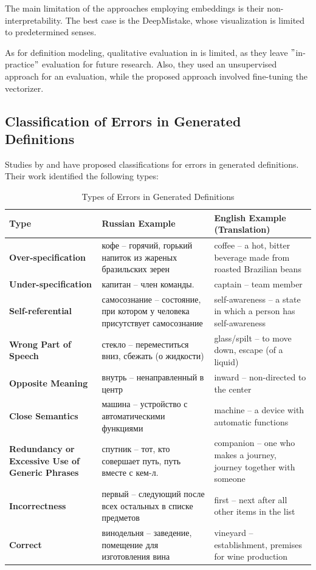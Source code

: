 \documentclass[11pt]{article}
\begin{document}
The main limitation of the approaches employing embeddings is their non-interpretability.
The best case is the DeepMistake, whose visualization is limited to predetermined senses.

As for definition modeling, qualitative evaluation in  is limited, as they leave \("\)in-practice\("\) evaluation for future research.
Also, they used an unsupervised approach for an evaluation, while the proposed approach involved fine-tuning the vectorizer.

\subsection{Classification of Errors in Generated Definitions}

Studies by  and  have proposed classifications for errors in generated definitions.
Their work identified the following types:

\begin{table}[H]
    \centering
    \caption{Types of Errors in Generated Definitions}
    \begin{tabular}{|p{3.5cm}|p{6.5cm}|p{5.5cm}|}
        \hline
        \textbf{Type} & \textbf{Russian Example} & \textbf{English Example (Translation)} \\ \hline
        \textbf{Over-specification} & кофе -- горячий, горький напиток из жареных бразильских зерен & coffee -- a hot, bitter beverage made from roasted Brazilian beans \\ \hline
        \textbf{Under-specification} & капитан -- член команды. & captain -- team member \\ \hline
        \textbf{Self-referential} & самосознание -- состояние, при котором у человека присутствует самосознание & self-awareness -- a state in which a person has self-awareness \\ \hline
        \textbf{Wrong Part of Speech} & стекло -- переместиться вниз, сбежать (о жидкости) & glass/spilt -- to move down, escape (of a liquid) \\ \hline
        \textbf{Opposite Meaning} & внутрь -- ненаправленный в центр & inward -- non-directed to the center \\ \hline
        \textbf{Close Semantics} & машина -- устройство с автоматическими функциями & machine -- a device with automatic functions \\ \hline
        \textbf{Redundancy or Excessive Use of Generic Phrases} & спутник -- тот, кто совершает путь, путь вместе с кем-л. & companion -- one who makes a journey, journey together with someone \\ \hline
        \textbf{Incorrectness} & первый -- следующий после всех остальных в списке предметов & first -- next after all other items in the list \\ \hline
        \textbf{Correct} & винодельня -- заведение, помещение для изготовления вина & vineyard -- establishment, premises for wine production \\ \hline
    \end{tabular}
    \label{tab:error_classification}
\end{table}
\end{document}

